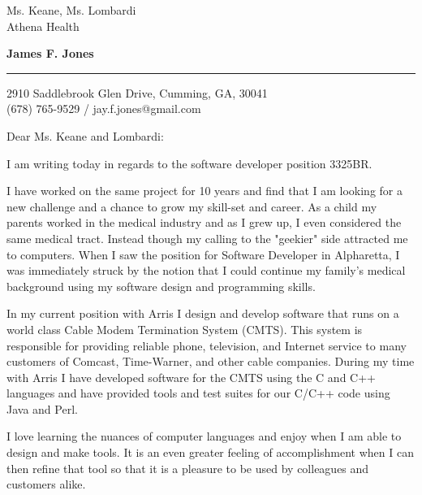 \documentclass{letter} %
\begin{document}
\signature{James F. Jones}           %
\longindentation=0pt                       %
\let\raggedleft\raggedright                %
 
 
\begin{letter}{Ms. Keane, Ms. Lombardi\\
Athena Health
}


\begin{flushleft}
{\large\bf James F. Jones}
\end{flushleft}
\medskip\hrule height 1pt
\begin{flushright}
\hfill 2910 Saddlebrook Glen Drive, Cumming, GA, 30041\\
\hfill (678) 765-9529 / jay.f.jones@gmail.com
\end{flushright} 
\vfill %

\opening{Dear Ms. Keane and Lombardi:} 
 
\noindent 
I am writing today in regards to the software developer position
3325BR.

\noindent I have worked on the same project for 10 years and find
that I am looking for a new challenge and a chance to grow my 
skill-set and career.  As a child my parents worked
in the medical industry and as I grew up, I even considered the same
medical tract.  Instead though my calling to the "geekier" side
attracted me to computers.  When I saw the position for Software 
Developer in Alpharetta, I was immediately struck by the notion that 
I could continue my family's medical background using my software
design and programming skills.

In my current position with Arris I design and develop software
that runs on a world class Cable Modem Termination System (CMTS).  This
system is responsible for providing reliable phone, television, and Internet
service to many customers of Comcast, Time-Warner, and other 
cable companies. During my time with Arris I have developed software
for the CMTS using the C and C++ languages and have provided tools and test 
suites for our C/C++ code using Java and Perl.

I love learning the nuances of computer languages and enjoy 
when I am able to design and make tools.  It is an even greater
feeling of accomplishment when I can then refine that tool so that it is a
pleasure to be used by colleagues and customers alike.


\end{letter}
\end{document}
